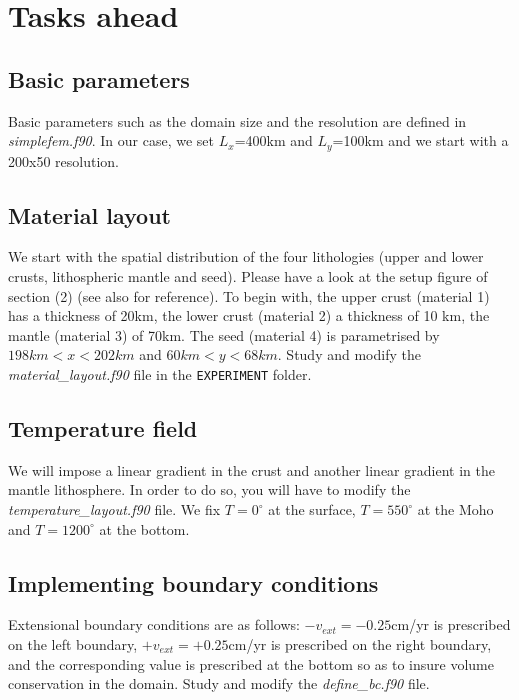 \section*{Tasks ahead}

\subsection*{Basic parameters}

Basic parameters such as the domain size and the resolution are defined in {\sl simplefem.f90}.
In our case, we set $L_x$=400km and $L_y$=100km and we start with a 200x50 resolution. 

\subsection*{Material layout}

We start with the spatial distribution of the four lithologies (upper and lower crusts, lithospheric mantle and seed). 
Please have a look at the setup figure of section (2) (see also \cite{nabu15} for reference). 
To begin with, the upper crust (material 1) has a thickness of 20km, the lower crust (material 2) a thickness of 10 km, 
the mantle (material 3) of 70km. The seed (material 4) is parametrised by $198km<x<202km$ and $60km<y<68km$.
Study and modify the {\sl material\_layout.f90} file in the {\tt EXPERIMENT} folder. 

\subsection*{Temperature field}

We will impose a linear gradient in the crust and another linear gradient in the mantle lithosphere.
In order to do so, you will have to modify the {\sl temperature\_layout.f90} file. We fix $T=0^\circ$ at the 
surface, $T=550^\circ$ at the Moho and $T=1200^\circ$ at the bottom.

\subsection*{Implementing boundary conditions}

Extensional boundary conditions are as follows: 
$-v_{ext}=-0.25$cm/yr is prescribed on the left boundary,
$+v_{ext}=+0.25$cm/yr is prescribed on the right boundary,
and the corresponding value is prescribed at the bottom so as to insure volume conservation in the domain.
Study and modify the {\sl define\_bc.f90} file.

